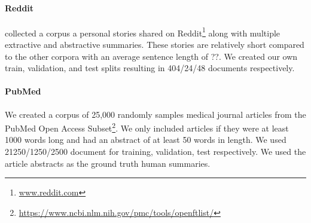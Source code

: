 \paragraph{Reddit}{\cite{ouyang2017crowd} collected a corpus a personal 
    stories shared
 on Reddit\footnote{\url{www.reddit.com}} along with multiple extractive 
 and abstractive summaries. These stories are relatively short compared
 to the other corpora with an average sentence length of ??. 
 We created our own train, validation, and test splits resulting in 
404/24/48 documents respectively. 
}

\paragraph{PubMed}{We created a corpus of 25,000 randomly samples 
    medical journal articles from the PubMed Open Access 
    Subset\footnote{\url{https://www.ncbi.nlm.nih.gov/pmc/tools/openftlist/}}.
    We only included articles if they were at least 1000 words long and 
    had an abstract of at least 50 words in length.
    We used 21250/1250/2500 document for training, validation, test 
    respectively. 
We used the article abstracts as the ground truth human summaries.}



